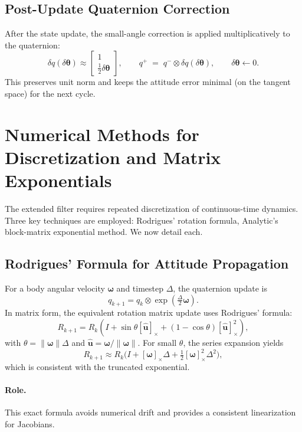 \documentclass[10pt]{extarticle}
\begin{document}
\subsection{Post-Update Quaternion Correction}
After the state update, the small-angle correction is applied multiplicatively to the quaternion:
\begin{equation}
\delta q(\delta\bm\theta) \approx \begin{bmatrix}1\\ \tfrac{1}{2}\delta\bm\theta\end{bmatrix},
\qquad
q^+ \;=\; q^- \otimes \delta q(\delta\bm\theta),
\qquad
\delta\bm\theta \leftarrow 0.
\label{eq:quat-correct}
\end{equation}
This preserves unit norm and keeps the attitude error minimal (on the tangent space) for the next cycle.


\section{Numerical Methods for Discretization and Matrix Exponentials}
\label{sec:numerical-methods}

The extended filter requires repeated discretization of continuous-time dynamics.
Three key techniques are employed: Rodrigues’ rotation formula, Analytic’s
block-matrix exponential method. We now detail each.

\subsection{Rodrigues’ Formula for Attitude Propagation}
For a body angular velocity $\bm\omega$ and timestep $\Delta$, the quaternion update
is
\[
q_{k+1} = q_k \otimes \exp\!\left(\tfrac{\Delta}{2}\bm\omega\right).
\]
In matrix form, the equivalent rotation matrix update uses Rodrigues’ formula:
\begin{equation}
R_{k+1} = R_k\left(I + \sin\theta [\hat{\bm u}]_\times +
(1-\cos\theta)[\hat{\bm u}]_\times^2\right),
\label{eq:rodrigues-final}
\end{equation}
with $\theta = \|\bm\omega\|\Delta$ and $\hat{\bm u}=\bm\omega/\|\bm\omega\|$.
For small $\theta$, the series expansion yields
\[
R_{k+1} \approx R_k\Big(I + [\bm\omega]_\times \Delta + \tfrac{1}{2}[\bm\omega]_\times^2 \Delta^2\Big),
\]
which is consistent with the truncated exponential.

\paragraph{Role.}
This exact formula avoids numerical drift and provides a consistent
linearization for Jacobians.
\end{document}
